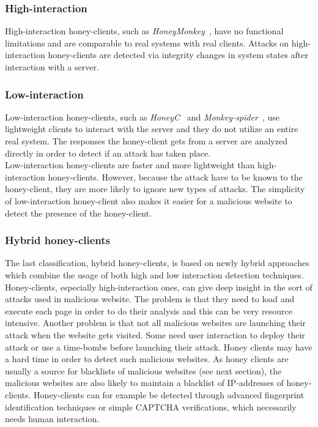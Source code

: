 \documentclass[twoside,openright,notitlepage]{uva-bachelor-thesis}
\begin{document}
\subsubsection{High-interaction}
High-interaction honey-clients, such as \emph{HoneyMonkey}~\cite{wang2006automated}, have no functional limitations and are comparable to real systems with real clients. Attacks on high-interaction honey-clients are detected via integrity changes in system states after interaction with a server. 

\subsubsection{Low-interaction}
Low-interaction honey-clients, such as \emph{HoneyC}~\cite{seiferthoneyc} and \emph{Monkey-spider}~\cite{ikinci2008monkey}, use lightweight clients to interact with the server and they do not utilize an entire real system. The responses the honey-client gets from a server are analyzed directly in order to detect if an attack has taken place.\\
Low-interaction honey-clients are faster and more lightweight than high-interaction honey-clients. However, because the attack have to be known to the honey-client, they are more likely to ignore new types of attacks. The simplicity of low-interaction honey-client also makes it easier for a malicious website to detect the presence of the honey-client.

\subsubsection{Hybrid honey-clients}
The last classification, hybrid honey-clients, is based on newly hybrid approaches which combine the usage of both high and low interaction detection techniques.\\

Honey-clients, especially high-interaction ones, can give deep insight in the sort of attacks used in malicious website.
The problem is that they need to load and execute each page in order to do their analysis and this can be very resource intensive. Another problem is that not all malicious websites are launching their attack when the website gets visited. Some need user interaction to deploy their attack or use a time-bombs before launching their attack. Honey clients may have a hard time in order to detect such malicious websites. As honey clients are usually a source for blacklists of malicious websites (see next section), the malicious websites are also likely to maintain a blacklist of IP-addresses of honey-clients. Honey-clients can for example be detected through advanced fingerprint identification techniques or simple CAPTCHA verifications, which necessarily needs human interaction.~\cite{qassrawi2011detecting}
\end{document}
